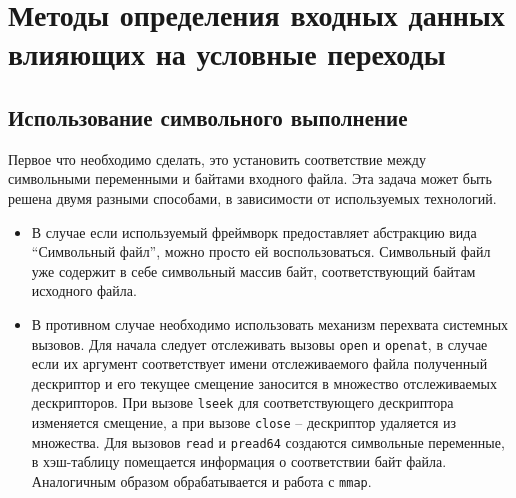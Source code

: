 \chapter{Методы определения входных данных влияющих на условные переходы}









\section{Использование символьного выполнение}

Первое что необходимо сделать, это установить соответствие между символьными переменными и байтами входного файла. Эта задача может быть решена двумя разными способами, в зависимости от используемых технологий.

\begin{itemize}
    \item В случае если используемый фреймворк предоставляет абстракцию вида ``Символьный файл'', можно просто ей воспользоваться. Символьный файл уже содержит в себе символьный массив байт, соответствующий байтам исходного файла.
    \item В противном случае необходимо использовать механизм перехвата системных вызовов. Для начала следует отслеживать вызовы \texttt{open} и \texttt{openat}, в случае если их аргумент соответствует имени отслеживаемого файла полученный дескриптор и его текущее смещение заносится в множество отслеживаемых дескрипторов. При вызове \texttt{lseek} для соответствующего дескриптора изменяется смещение, а при вызове \texttt{close} -- дескриптор удаляется из множества. Для вызовов \texttt{read} и \texttt{pread64} создаются символьные переменные, в хэш-таблицу помещается информация о соответствии байт файла. Аналогичным образом обрабатывается и работа с \texttt{mmap}.
\end{itemize}


